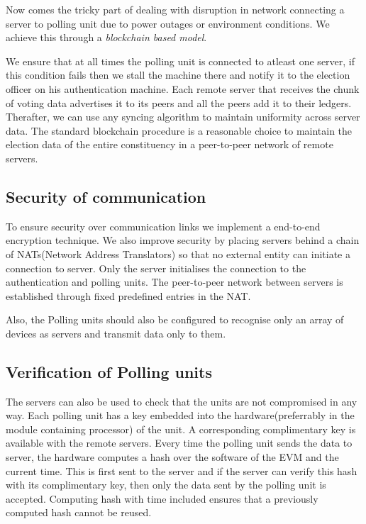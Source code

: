 \documentclass[a4paper,12pt,openany]{book}
\begin{document}
Now comes the tricky part of dealing with disruption in network connecting a server to polling unit due to power outages or environment conditions. We achieve this through a \emph{blockchain based model}.

We ensure that at all times the polling unit is connected to atleast one server, if this condition fails then we stall the machine there and notify it to the election officer on his authentication machine. Each remote server that receives the chunk of voting data advertises it to its peers and all the peers add it to their ledgers. Therafter, we can  use any syncing algorithm to maintain uniformity across server data. The standard blockchain procedure is a reasonable choice to maintain the election data of the entire constituency in a peer-to-peer network of remote servers. 

\subsection{Security of communication}
To ensure security over communication links we implement a end-to-end encryption technique. We also improve security by placing servers behind a chain of NATs(Network Address Translators) so that no external entity can initiate a connection to server. Only the server initialises the connection to the authentication and polling units. The peer-to-peer network between servers is established through fixed predefined entries in the NAT.

Also, the Polling units should also be configured to recognise only an array of devices as servers and transmit data only to them.

\subsection{Verification of Polling units}
The servers can also be used to check that the units are not compromised in any way. Each polling unit has a key embedded into the hardware(preferrably in the module containing processor) of the unit. A corresponding complimentary key is available with the remote servers.
Every time the polling unit sends the data to server, the hardware computes a hash over the software of the EVM and the current time. This is first sent to the server and if the server can verify this hash with its complimentary key, then only the data sent by the polling unit is accepted. Computing hash with time included ensures that a previously computed hash cannot be reused.
\end{document}
